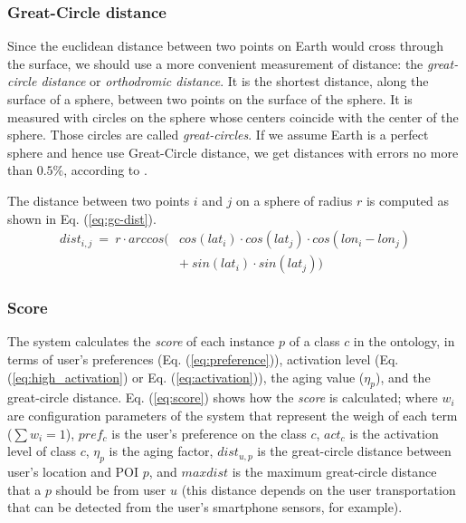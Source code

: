 \subsubsection{\bf Great-Circle distance}
Since the euclidean distance between two points on Earth would cross through the surface, we should use a more convenient measurement of distance: the \textit{great-circle distance} or \textit{orthodromic distance}. It is the shortest distance, along the surface of a sphere, between two points on the surface of the sphere. It is measured with circles on the sphere whose centers coincide with the center of the sphere. Those circles are called \textit{great-circles}. If we assume Earth is a perfect sphere and hence use Great-Circle distance, we get distances with errors no more than $0.5\%$, according to \cite{1997admiralty}. 

The distance between two points $i$ and $j$ on a sphere of radius $r$ is computed as shown in Eq. (\ref{eq:gc-dist}).
\begin{equation} \label{eq:gc-dist}
    \begin{split}
        \scriptstyle{dist_{i,j} \ = \ r \cdot arccos (} & \scriptstyle{cos(lat_i) \cdot cos(lat_j) \cdot cos(lon_i - lon_j)} \\
                                        & \scriptstyle{+ \ sin(lat_i) \cdot sin(lat_j) )}
    \end{split}
\end{equation}

\subsubsection{\bf Score} \label{section:score}
The system calculates the \textit{score} of each instance $p$ of a class $c$ in  the ontology, in terms of user's preferences (Eq. (\ref{eq:preference})), activation level (Eq. (\ref{eq:high_activation}) or Eq. (\ref{eq:activation})), the aging value ($\eta_p$), and the great-circle distance. Eq. (\ref{eq:score}) shows how the \textit{score} is calculated; where $w_i$ are configuration parameters of the system that represent the weigh of each term ($\sum w_i =1$), $pref_c$ is the user's preference on the class $c$, $act_c$ is the activation level of class $c$, $\eta_p$ is the aging factor, $dist_{u,p}$ is the great-circle distance between user's location and POI $p$, and $maxdist$ is the maximum great-circle distance that a $p$ should be from user $u$  (this distance depends on the user transportation that can be detected  from the user's smartphone sensors, for example).

